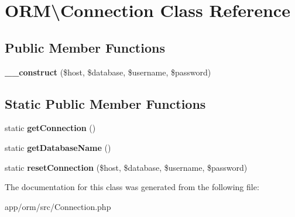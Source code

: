 \hypertarget{classORM_1_1Connection}{}\section{O\+RM\textbackslash{}Connection Class Reference}
\label{classORM_1_1Connection}
\subsection*{Public Member Functions}
\begin{DoxyCompactItemize}
\item 
{\bfseries \+\_\+\+\_\+construct} (\$host, \$database, \$username, \$password)\hypertarget{classORM_1_1Connection_a1c6ec23c8fbb434230c4eed1d00b70ca}{}\label{classORM_1_1Connection_a1c6ec23c8fbb434230c4eed1d00b70ca}

\end{DoxyCompactItemize}
\subsection*{Static Public Member Functions}
\begin{DoxyCompactItemize}
\item 
static {\bfseries get\+Connection} ()\hypertarget{classORM_1_1Connection_a79212f0ac8a8842e3fe64740c10b8975}{}\label{classORM_1_1Connection_a79212f0ac8a8842e3fe64740c10b8975}

\item 
static {\bfseries get\+Database\+Name} ()\hypertarget{classORM_1_1Connection_a6705d29d14c4a87924db9a18b1294eae}{}\label{classORM_1_1Connection_a6705d29d14c4a87924db9a18b1294eae}

\item 
static {\bfseries reset\+Connection} (\$host, \$database, \$username, \$password)\hypertarget{classORM_1_1Connection_aced85c48449dc401c84abf68f38671e8}{}\label{classORM_1_1Connection_aced85c48449dc401c84abf68f38671e8}

\end{DoxyCompactItemize}


The documentation for this class was generated from the following file\+:\begin{DoxyCompactItemize}
\item 
app/orm/src/Connection.\+php\end{DoxyCompactItemize}
